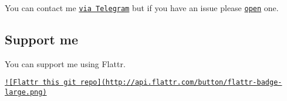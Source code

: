 You can contact me \href{https://telegram.me/ggrillo}{\tt via Telegram} but if you have an issue please \href{https://github.com/Eleirbag89/TelegramBotPHP/issues}{\tt open} one.

\subsection*{Support me }

You can support me using Flattr.

\href{https://flattr.com/submit/auto?user_id=eleirbag89&url=https://github.com/Eleirbag89/TelegramBotPHP&title=TelegramBotPHP&language=&tags=github&category=software}{\tt !\mbox{[}Flattr this git repo\mbox{]}(http\-://api.\-flattr.\-com/button/flattr-\/badge-\/large.\-png)} 